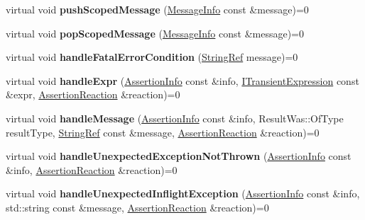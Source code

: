 \begin{DoxyCompactItemize}
\item 
virtual void {\bfseries push\+Scoped\+Message} (\hyperlink{structCatch_1_1MessageInfo}{Message\+Info} const \&message)=0\hypertarget{structCatch_1_1IResultCapture_a91d154c1e087e383dcde5aad95cb6a05}{}\label{structCatch_1_1IResultCapture_a91d154c1e087e383dcde5aad95cb6a05}

\item 
virtual void {\bfseries pop\+Scoped\+Message} (\hyperlink{structCatch_1_1MessageInfo}{Message\+Info} const \&message)=0\hypertarget{structCatch_1_1IResultCapture_a42bcb13276706bf8c3ce081ce16d37fd}{}\label{structCatch_1_1IResultCapture_a42bcb13276706bf8c3ce081ce16d37fd}

\item 
virtual void {\bfseries handle\+Fatal\+Error\+Condition} (\hyperlink{classCatch_1_1StringRef}{String\+Ref} message)=0\hypertarget{structCatch_1_1IResultCapture_a48559e6598ba9474b903697b69c769b2}{}\label{structCatch_1_1IResultCapture_a48559e6598ba9474b903697b69c769b2}

\item 
virtual void {\bfseries handle\+Expr} (\hyperlink{structCatch_1_1AssertionInfo}{Assertion\+Info} const \&info, \hyperlink{structCatch_1_1ITransientExpression}{I\+Transient\+Expression} const \&expr, \hyperlink{structCatch_1_1AssertionReaction}{Assertion\+Reaction} \&reaction)=0\hypertarget{structCatch_1_1IResultCapture_a59a2b05391e464954575d2afb6d5d607}{}\label{structCatch_1_1IResultCapture_a59a2b05391e464954575d2afb6d5d607}

\item 
virtual void {\bfseries handle\+Message} (\hyperlink{structCatch_1_1AssertionInfo}{Assertion\+Info} const \&info, Result\+Was\+::\+Of\+Type result\+Type, \hyperlink{classCatch_1_1StringRef}{String\+Ref} const \&message, \hyperlink{structCatch_1_1AssertionReaction}{Assertion\+Reaction} \&reaction)=0\hypertarget{structCatch_1_1IResultCapture_a21788ebc64571abf322b80c8cc51794d}{}\label{structCatch_1_1IResultCapture_a21788ebc64571abf322b80c8cc51794d}

\item 
virtual void {\bfseries handle\+Unexpected\+Exception\+Not\+Thrown} (\hyperlink{structCatch_1_1AssertionInfo}{Assertion\+Info} const \&info, \hyperlink{structCatch_1_1AssertionReaction}{Assertion\+Reaction} \&reaction)=0\hypertarget{structCatch_1_1IResultCapture_a6382ed20486e2d9a020da971c6d5c53d}{}\label{structCatch_1_1IResultCapture_a6382ed20486e2d9a020da971c6d5c53d}

\item 
virtual void {\bfseries handle\+Unexpected\+Inflight\+Exception} (\hyperlink{structCatch_1_1AssertionInfo}{Assertion\+Info} const \&info, std\+::string const \&message, \hyperlink{structCatch_1_1AssertionReaction}{Assertion\+Reaction} \&reaction)=0\hypertarget{structCatch_1_1IResultCapture_afc97bc69829185222f955ebeef97adfe}{}\label{structCatch_1_1IResultCapture_afc97bc69829185222f955ebeef97adfe}


\end{DoxyCompactItemize}
